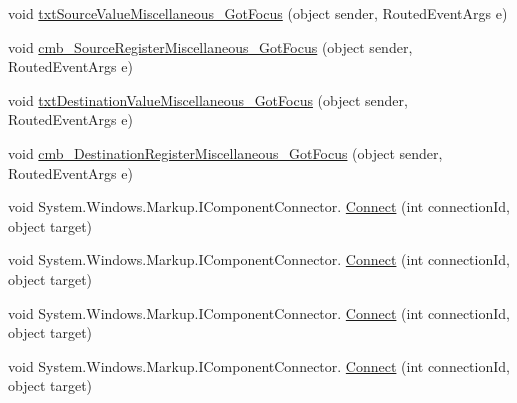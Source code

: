 \begin{DoxyCompactItemize}
\item 
void \hyperlink{class_c_p_u___o_s___simulator_1_1_instructions_window_ae5a577d3fa0f6abeb8239de87a4c4a48}{txt\+Source\+Value\+Miscellaneous\+\_\+\+Got\+Focus} (object sender, Routed\+Event\+Args e)
\item 
void \hyperlink{class_c_p_u___o_s___simulator_1_1_instructions_window_aebeed4545e10bda489f1f73f4c09a20c}{cmb\+\_\+\+Source\+Register\+Miscellaneous\+\_\+\+Got\+Focus} (object sender, Routed\+Event\+Args e)
\item 
void \hyperlink{class_c_p_u___o_s___simulator_1_1_instructions_window_aceca94bcec64cbfd4cfe472e9dd34a58}{txt\+Destination\+Value\+Miscellaneous\+\_\+\+Got\+Focus} (object sender, Routed\+Event\+Args e)
\item 
void \hyperlink{class_c_p_u___o_s___simulator_1_1_instructions_window_aa05471f59f3884c72353dd2fd41fbabf}{cmb\+\_\+\+Destination\+Register\+Miscellaneous\+\_\+\+Got\+Focus} (object sender, Routed\+Event\+Args e)
\item 
void System.\+Windows.\+Markup.\+I\+Component\+Connector. \hyperlink{class_c_p_u___o_s___simulator_1_1_instructions_window_a0efa7624a59a6abc64d0940ffaa100b0}{Connect} (int connection\+Id, object target)
\item 
void System.\+Windows.\+Markup.\+I\+Component\+Connector. \hyperlink{class_c_p_u___o_s___simulator_1_1_instructions_window_a0efa7624a59a6abc64d0940ffaa100b0}{Connect} (int connection\+Id, object target)
\item 
void System.\+Windows.\+Markup.\+I\+Component\+Connector. \hyperlink{class_c_p_u___o_s___simulator_1_1_instructions_window_a0efa7624a59a6abc64d0940ffaa100b0}{Connect} (int connection\+Id, object target)
\item 
void System.\+Windows.\+Markup.\+I\+Component\+Connector. \hyperlink{class_c_p_u___o_s___simulator_1_1_instructions_window_a0efa7624a59a6abc64d0940ffaa100b0}{Connect} (int connection\+Id, object target)
\end{DoxyCompactItemize}

